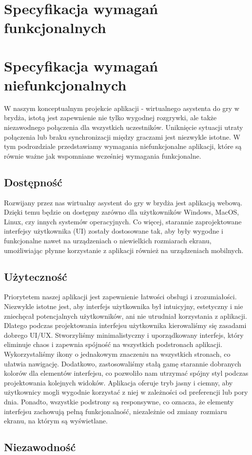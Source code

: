 


\section{Specyfikacja wymagań funkcjonalnych}


\section{Specyfikacja wymagań niefunkcjonalnych}
W naszym konceptualnym projekcie aplikacji - wirtualnego asystenta do gry w brydża, istotą jest zapewnienie nie tylko wygodnej rozgrywki, ale także niezawodnego połączenia dla wszystkich uczestników. Uniknięcie sytuacji utraty połączenia lub braku synchronizacji między graczami jest niezwykle istotne. W tym podrozdziale przedstawiamy wymagania niefunkcjonalne aplikacji, które są równie ważne jak wspomniane wcześniej wymagania funkcjonalne.
\subsection{Dostępność}
Rozwijany przez nas wirtualny asystent do gry w brydża jest aplikacją webową. Dzięki temu będzie on dostępny zarówno dla użytkowników Windows, MacOS, Linux, czy innych systemów operacyjnych. Co więcej, starannie zaprojektowane interfejsy użytkownika (UI) zostały dostosowane tak, aby były wygodne i funkcjonalne nawet na urządzeniach o niewielkich rozmiarach ekranu, umożliwiając płynne korzystanie z aplikacji również na urządzeniach mobilnych.
\subsection{Użyteczność}
Priorytetem naszej aplikacji jest zapewnienie łatwości obsługi i zrozumiałości. Niezwykle istotne jest, aby interfejs użytkownika był intuicyjny, estetyczny i nie zniechęcał potencjalnych użytkowników, ani nie utrudniał korzystania z aplikacji. Dlatego podczas projektowania interfejsu użytkownika kierowaliśmy się zasadami dobrego UI/UX. Stworzyliśmy minimalistyczny i uporządkowany interfejs, który eliminuje chaos i zapewnia spójność na wszystkich podstronach aplikacji. Wykorzystaliśmy ikony o jednakowym znaczeniu na wszystkich stronach, co ułatwia nawigację. Dodatkowo, zastosowaliśmy stałą gamę starannie dobranych kolorów dla elementów interfejsu, co pozwoliło nam utrzymać spójny styl podczas projektowania kolejnych widoków. Aplikacja oferuje tryb jasny i ciemny, aby użytkownicy mogli wygodnie korzystać z niej w zależności od preferencji lub pory dnia. Ponadto, wszystkie podstrony są responsywne, co oznacza, że elementy interfejsu zachowują pełną funkcjonalność, niezależnie od zmiany rozmiaru ekranu, na którym są wyświetlane.
\subsection{Niezawodność}
